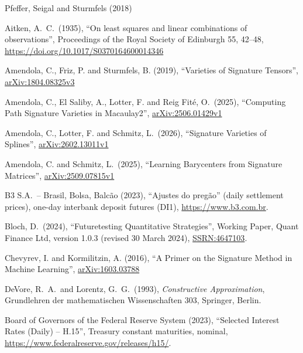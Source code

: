 \documentclass[11pt,english]{article}
\theoremstyle{definition}
\theoremstyle{remark}
\begin{document}
\begingroup
\small
\begin{thebibliography}{Pfeffer, Seigal and Sturmfels (2018)}

Aitken, A.~C.\ (1935), ``On least squares
and linear combinations of observations'', Proceedings of the Royal
Society of Edinburgh 55, 42--48,
\href{https://doi.org/10.1017/S0370164600014346}{https://doi.org/10.1017/S0370164600014346}

Amendola, C.,
Friz, P. and Sturmfels, B. (2019), ``Varieties of Signature Tensors'',
\href{https://arxiv.org/abs/1804.08325v3}{arXiv:1804.08325v3}

Amendola, C., El Saliby, A.,
Lotter, F. and Reig Fité, O.\ (2025), ``Computing Path Signature Varieties
in Macaulay2'',
\href{https://arxiv.org/abs/2506.01429v1}{arXiv:2506.01429v1}

Amendola, C.,
Lotter, F. and Schmitz, L.\ (2026), ``Signature Varieties of Splines'',
\href{https://arxiv.org/abs/2602.13011v1}{arXiv:2602.13011v1}

Amendola, C. and
Schmitz, L.\ (2025), ``Learning Barycenters from Signature Matrices'',
\href{https://arxiv.org/abs/2509.07815v1}{arXiv:2509.07815v1}

B3 S.A.\ -- Brasil, Bolsa, Balcão (2023),
``Ajustes do pregão'' (daily settlement prices), one-day interbank
deposit futures (DI1), \url{https://www.b3.com.br}.

Bloch, D.\ (2024),
``Futuretesting Quantitative Strategies'', Working Paper, Quant
Finance Ltd, version 1.0.3 (revised 30 March 2024),
\href{https://papers.ssrn.com/sol3/papers.cfm?abstract_id=4647103}{SSRN:4647103}.

Chevyrev, I. and Kormilitzin, A.
(2016), ``A Primer on the Signature Method in Machine Learning'',
\href{https://arxiv.org/abs/1603.03788}{arXiv:1603.03788}

DeVore, R.~A.\ and
Lorentz, G.~G.\ (1993), \emph{Constructive Approximation}, Grundlehren
der mathematischen Wissenschaften 303, Springer, Berlin.

Board of Governors of the
Federal Reserve System (2023), ``Selected Interest Rates (Daily) --
H.15'', Treasury constant maturities, nominal,
\url{https://www.federalreserve.gov/releases/h15/}.


\end{thebibliography}
\end{document}
